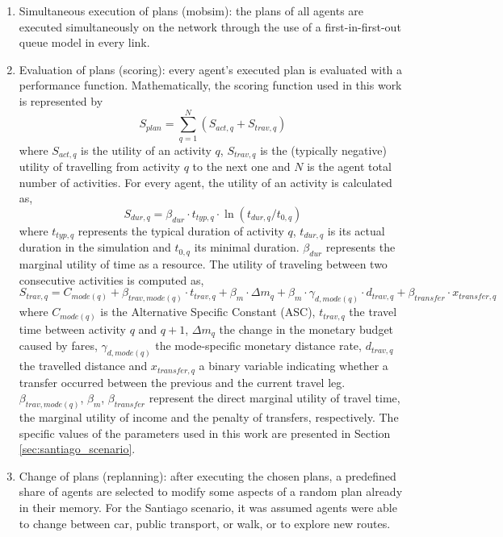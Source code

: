 \documentclass[Journal,letterpaper]{ascelike-new}
\begin{document}
\begin{enumerate}
    \item Simultaneous execution of plans (mobsim): the plans of all agents are executed simultaneously on the network through the use of a first-in-first-out queue model in every link.
    \item Evaluation of plans (scoring): every agent's executed plan is evaluated with a performance function. Mathematically, the scoring function used in this work is represented by \citep{charypar2005generating} %
    \begin{equation}
    S_{plan}=\sum_{q=1}^{N}(S_{act,q}+S_{trav,q})
    \end{equation}
    where $S_{act,q}$ is the utility of an activity $q$, $S_{trav,q}$ is the (typically negative) utility of travelling from activity $q$ to the next one and $N$ is the agent total number of activities. For every agent, the utility of an activity is calculated as,
    \begin{equation}
    S_{\mathit{dur,q}}=\beta_{\mathit{dur}}\cdot t_{typ,q}\cdot \ln(\mathit{t_{dur,q}}/t_{0,q})
    \end{equation}
    where $t_{typ,q}$ represents the typical duration of activity $q$, $t_{dur,q}$ is its actual duration in the simulation and $t_{0,q}$ its minimal duration. $\beta_{\mathit{dur}}$ represents the marginal utility of time as a resource. 
    The utility of traveling between two consecutive activities is computed as,
    \begin{equation}
    \label{performanceTraveling}
    S_{\mathit{trav,q}}=C_{\mathit{mode(q)}}+\beta_{\mathit{trav,mode(q)}}\cdot t_{\mathit{trav,q}}+\beta_{m}\cdot \Delta m_{q} +\beta_{m}\cdot \gamma_{\mathit{d,mode(q)}}\cdot d_{\mathit{trav,q}} + \beta_{\mathit{transfer}}\cdot x_{\mathit{transfer,q}}
    \end{equation}
    where $C_{\mathit{mode(q)}}$ is the Alternative Specific Constant (ASC), $t_{\mathit{trav,q}}$ the travel time between activity $q$ and $q+1$, $\Delta m_{q}$ the change in the monetary budget caused by fares, $\gamma_{\mathit{d,mode(q)}}$ the mode-specific monetary distance rate, $d_{\mathit{trav,q}}$ the travelled distance and $x_{\mathit{transfer,q}}$ a binary variable indicating whether a transfer occurred between the previous and the current travel leg. $\beta_{\mathit{trav,mode(q)}}$, $\beta_{m}$, $\beta_{\mathit{transfer}}$ represent the direct marginal utility of travel time, the marginal utility of income and the penalty of transfers, respectively. The specific values of the parameters used in this work are presented in Section \ref{sec:santiago_scenario}. %
    \item Change of plans (replanning): after executing the chosen plans, a predefined share of agents are selected to modify some aspects of a random plan already in their memory. For the Santiago scenario, it was assumed agents were able to change between car, public transport, or walk, or to explore new routes. %
\end{enumerate}
\end{document}
